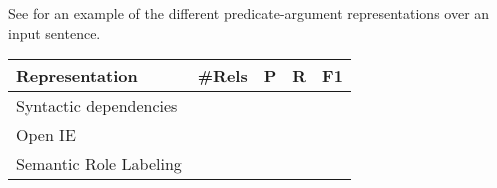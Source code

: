 See  for an example of the different predicate-argument
representations over an input sentence.


\begin{table}[]
\begin{tabular}{@{}lllll@{}}
\toprule
Representation         & \#Rels & P & R & F1 \\ \midrule
Syntactic dependencies &             &           &        &    \\
Open IE                &             &           &        &    \\
Semantic Role Labeling  &             &           &        &    \\ \bottomrule
\end{tabular}
\end{table}
